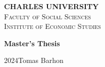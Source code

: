 \documentclass [a4paper,12pt]{report}
\def \BookName {Master's Thesis}
\def \AutorDP {Tomas Barhon}
\def \Year {2024}
\def \CUNI {CHARLES UNIVERSITY}
\def \FSS {Faculty of Social Sciences}
\def \IES {Institute of Economic Studies}
\begin{document}
\pagestyle{empty}

    \begin{center}
    {\LARGE \textbf{\CUNI}}\\[2ex]
    {\LARGE \textsc{\FSS}}\\[1ex]
 	  {\large \textsc{\IES}}

		\vspace{8.47cm}
		
    {\Huge \textbf{\BookName} \\[4ex]

    }

    \vfill

    {\Large \Year \hfill \AutorDP}\\[6ex]

    \newpage
    \end{center}
\end{document}
